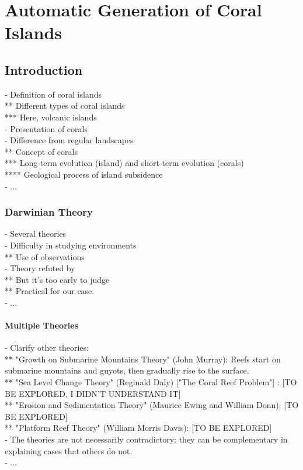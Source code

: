 \chapter{Automatic Generation of Coral Islands}
\label{chap:coral-island}
\minitoc

\section{Introduction}
\label{sec:coral-island_introduction}
- Definition of coral islands \\
** Different types of coral islands \\
*** Here, volcanic islands \\
- Presentation of corals \\
- Difference from regular landscapes \\
** Concept of corals \\
*** Long-term evolution (island) and short-term evolution (corals) \\
**** Geological process of island subsidence \\
- ...

\subsection{Darwinian Theory}
- Several theories \\
- Difficulty in studying environments \\
** Use of observations \\
- Theory refuted by \cite{Droxler2021} \\
** But it's too early to judge \\
** Practical for our case. \\
- ...

\subsubsection{Multiple Theories}
- Clarify other theories: \\
** "Growth on Submarine Mountains Theory" (John Murray): Reefs start on submarine mountains and guyots, then gradually rise to the surface. \\
** "Sea Level Change Theory" (Reginald Daly) ["The Coral Reef Problem"] \cite{Daly1915}: [TO BE EXPLORED, I DIDN'T UNDERSTAND IT] \\
** "Erosion and Sedimentation Theory" (Maurice Ewing and William Donn): [TO BE EXPLORED] \\
** "Platform Reef Theory" (William Morris Davis): [TO BE EXPLORED] \\
- The theories are not necessarily contradictory; they can be complementary in explaining cases that others do not. \\
- ...

